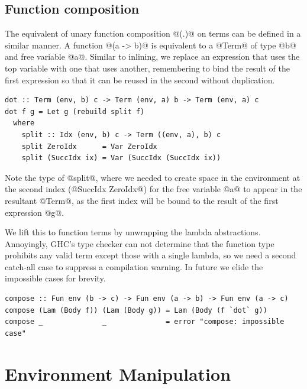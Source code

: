 
\subsection{Function composition}
\label{sec:function_composition}

The equivalent of unary function composition @(.)@ on terms can be
defined in a similar manner. A function @(a -> b)@ is equivalent to a
@Term@ of type @b@ and free variable @a@. Similar to inlining, we
replace an expression that uses the top variable with one that uses another,
remembering to bind the result of the first expression so that it can be reused
in the second without duplication.
%
\begin{lstlisting}[style=haskell
    ,name=function_composition
    ,caption={[A simultaneous substitution to compose unary function terms]}]
dot :: Term (env, b) c -> Term (env, a) b -> Term (env, a) c
dot f g = Let g (rebuild split f)
  where
    split :: Idx (env, b) c -> Term ((env, a), b) c
    split ZeroIdx      = Var ZeroIdx
    split (SuccIdx ix) = Var (SuccIdx (SuccIdx ix))
\end{lstlisting}
%
Note the type of @split@, where we needed to create space in the
environment at the second index (@SuccIdx ZeroIdx@) for the free variable
@a@ to appear in the resultant @Term@, as the first index will be
bound to the result of the first expression @g@.

We lift this to function terms by unwrapping the lambda abstractions.
Annoyingly, GHC's type checker can not determine that the function type
prohibits any valid term except those with a single lambda, so we need a second
catch-all case to suppress a compilation warning. In future we elide the
impossible cases for brevity.
%
\begin{lstlisting}[style=haskell,
    name=function_composition,
    caption={A simultaneous substitution to compose unary function terms}]
compose :: Fun env (b -> c) -> Fun env (a -> b) -> Fun env (a -> c)
compose (Lam (Body f)) (Lam (Body g)) = Lam (Body (f `dot` g))
compose _              _              = error "compose: impossible case"
\end{lstlisting}


\section{Environment Manipulation}
\label{sec:environment_manipulation}

